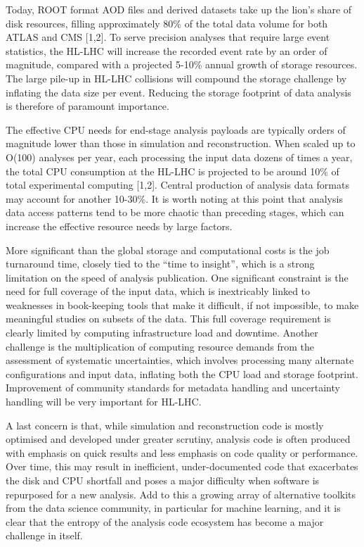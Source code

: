 \documentclass[10pt,a4paper]{article}
\begin{document}
Today, ROOT format AOD files and derived datasets take up the lion's
share of disk resources, filling approximately 80\% of the total data
volume for both ATLAS and CMS {[}1,2{]}. To serve precision analyses
that require large event statistics, the HL-LHC will increase the
recorded event rate by an order of magnitude, compared with a projected
5-10\% annual growth of storage resources. The large pile-up in HL-LHC
collisions will compound the storage challenge by inflating the data
size per event. Reducing the storage footprint of data analysis is
therefore of paramount importance.

The effective CPU needs for end-stage analysis payloads are typically
orders of magnitude lower than those in simulation and reconstruction.
When scaled up to O(100) analyses per year, each processing the input
data dozens of times a year, the total CPU consumption at the HL-LHC is
projected to be around 10\% of total experimental computing {[}1,2{]}.
Central production of analysis data formats may account for another
10-30\%. It is worth noting at this point that analysis data access
patterns tend to be more chaotic than preceding stages, which can
increase the effective resource needs by large factors.

More significant than the global storage and computational costs is the
job turnaround time, closely tied to the ``time to insight'', which is a
strong limitation on the speed of analysis publication. One significant
constraint is the need for full coverage of the input data, which is
inextricably linked to weaknesses in book-keeping tools that make it
difficult, if not impossible, to make meaningful studies on subsets of
the data. This full coverage requirement is clearly limited by computing
infrastructure load and downtime. Another challenge is the
multiplication of computing resource demands from the assessment of
systematic uncertainties, which involves processing many alternate
configurations and input data, inflating both the CPU load and storage
footprint. Improvement of community standards for metadata handling and
uncertainty handling will be very important for HL-LHC.

A last concern is that, while simulation and reconstruction code is
mostly optimised and developed under greater scrutiny, analysis code is
often produced with emphasis on quick results and less emphasis on code
quality or performance. Over time, this may result in inefficient,
under-documented code that exacerbates the disk and CPU shortfall and
poses a major difficulty when software is repurposed for a new analysis.
Add to this a growing array of alternative toolkits from the data
science community, in particular for machine learning, and it is clear
that the entropy of the analysis code ecosystem has become a major
challenge in itself.
\end{document}
